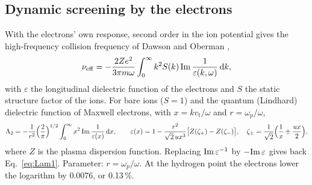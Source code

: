 \documentclass[11pt]{article}
\numberwithin{equation}{section}
\newcommand{\dd}{\mathrm d}
\newcommand{\nueff}{\nu_{\rm eff}}
\begin{document}
\subsection{Dynamic screening by the electrons}
\label{sec:escreen}
With the electrons' own response, second order in the ion potential gives the
high-frequency collision frequency of Dawson and Oberman \cite{DawsonOberman1962},
\begin{equation}
\nueff=-\frac{2Ze^2}{3\pi m\omega}\int_0^\infty k^2S(k)\,{\rm Im}\,\frac{1}{\varepsilon(k,\omega)}\,\dd k,
\label{eq:DO}
\end{equation}
with $\varepsilon$ the longitudinal dielectric function of the electrons and $S$ the
static structure factor of the ions. For bare ions ($S=1$) and the quantum (Lindhard)
dielectric function of Maxwell electrons, with $x=kv_t/\omega$ and $r=\omega_p/\omega$,
\begin{equation}
\Lambda_2=-\frac{1}{r^2}\Big(\frac2\pi\Big)^{1/2}\int_0^\infty x^2\,{\rm Im}\,\frac{1}{\varepsilon(x)}\,\dd x,\qquad
\varepsilon(x)=1-\frac{r^2}{\sqrt2\,ux^3}\big[Z(\zeta_+)-Z(\zeta_-)\big],\quad
\zeta_\pm=\frac{1}{\sqrt2}\Big(\frac1x\pm\frac{ux}{2}\Big),
\label{eq:Lam2}
\end{equation}
where $Z$ is the plasma dispersion function. Replacing ${\rm Im}\,\varepsilon^{-1}$ by
$-{\rm Im}\,\varepsilon$ gives back Eq.~\eqref{eq:Lam1}. Parameter: $r=\omega_p/\omega$.
At the hydrogen point the electrons lower the logarithm by 0.0076, or 0.13\,\%.
\end{document}
